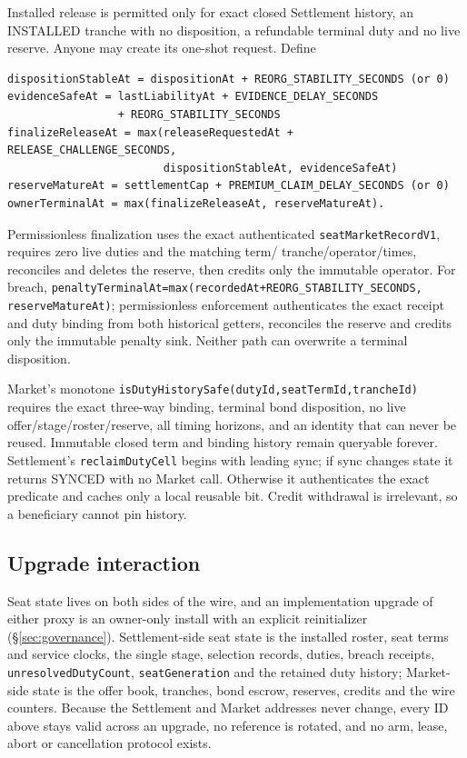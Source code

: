 \documentclass[a4paper,11pt]{article}
\newcommand{\code}[1]{\nolinkurl{#1}}
\begin{document}
Installed release is permitted only for exact closed Settlement history, an
INSTALLED tranche with no disposition, a refundable terminal duty and no live
reserve.  Anyone may create its one-shot request.  Define
\begin{verbatim}
dispositionStableAt = dispositionAt + REORG_STABILITY_SECONDS (or 0)
evidenceSafeAt = lastLiabilityAt + EVIDENCE_DELAY_SECONDS
                 + REORG_STABILITY_SECONDS
finalizeReleaseAt = max(releaseRequestedAt + RELEASE_CHALLENGE_SECONDS,
                        dispositionStableAt, evidenceSafeAt)
reserveMatureAt = settlementCap + PREMIUM_CLAIM_DELAY_SECONDS (or 0)
ownerTerminalAt = max(finalizeReleaseAt, reserveMatureAt).
\end{verbatim}
Permissionless finalization uses the exact authenticated
\code{seatMarketRecordV1}, requires zero live duties and the matching term/
tranche/operator/times, reconciles and
deletes the reserve, then credits only the immutable operator.  For breach,
\code{penaltyTerminalAt=max(recordedAt+REORG_STABILITY_SECONDS,
reserveMatureAt)}; permissionless enforcement authenticates the exact receipt
and duty binding from both historical getters,
reconciles the reserve and credits only the immutable penalty sink.  Neither
path can overwrite a terminal disposition.

Market's monotone
\code{isDutyHistorySafe(dutyId,seatTermId,trancheId)} requires the exact
three-way binding, terminal bond disposition, no live offer/stage/roster/reserve,
all timing horizons, and an identity that can never be reused.  Immutable closed
term and binding history remain queryable forever.  Settlement's
\code{reclaimDutyCell} begins with leading sync; if sync changes state it returns
SYNCED with no Market call.  Otherwise it authenticates the exact predicate and
caches only a local reusable bit.  Credit withdrawal is irrelevant, so a
beneficiary cannot pin history.

\subsection{Upgrade interaction}\label{sec:seat-upgrade}

Seat state lives on both sides of the wire, and an implementation upgrade of
either proxy is an owner-only install with an explicit reinitializer
(\S\ref{sec:governance}).  Settlement-side seat state is the installed roster,
seat terms and service clocks, the single stage, selection records, duties,
breach receipts, \code{unresolvedDutyCount}, \code{seatGeneration} and the
retained duty history; Market-side state is the offer book, tranches, bond
escrow, reserves, credits and the wire counters.  Because the Settlement and
Market addresses never change, every ID above stays valid across an upgrade,
no reference is rotated, and no arm, lease, abort or cancellation protocol
exists.
\end{document}
